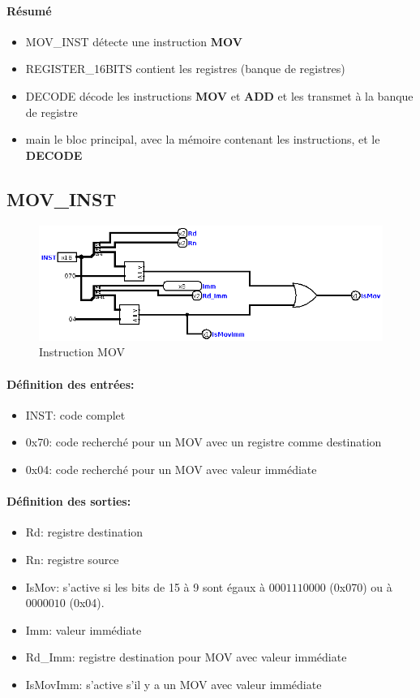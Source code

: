 \documentclass[a4paper]{article} %
\begin{document}
\paragraph{Résumé}
\begin{itemize}
    \item     MOV\_INST détecte une instruction \textbf{MOV}
    \item     REGISTER\_16BITS contient les registres (banque de registres)
    \item     DECODE décode les instructions \textbf{MOV} et \textbf{ADD} et les transmet à la banque de registre
    \item     main le bloc principal, avec la mémoire contenant les instructions, et le \textbf{DECODE}
\end{itemize}

\subsection{MOV\_INST}

\begin{figure}[H]
    \centering
    \includegraphics[width=.8\textwidth]{src/MOV_INST.png}
    \caption{Instruction MOV}
    \label{mov_img}
\end{figure}
\paragraph{Définition des entrées:}
\begin{itemize}
    \item     INST: code complet
    \item     0x70: code recherché pour un MOV avec un registre comme destination
    \item     0x04: code recherché pour un MOV avec valeur immédiate
\end{itemize}

\paragraph{Définition des sorties:}
\begin{itemize}
    \item     Rd: registre destination
    \item     Rn: registre source
    \item     IsMov: s'active si les bits de 15 à 9 sont égaux à $0001110000$ (0x070) ou à $0000010$ (0x04).
    \item     Imm: valeur immédiate
    \item     Rd\_Imm: registre destination pour MOV avec valeur immédiate
    \item     IsMovImm: s'active s'il y a un MOV avec valeur immédiate

\end{itemize}
\end{document}
